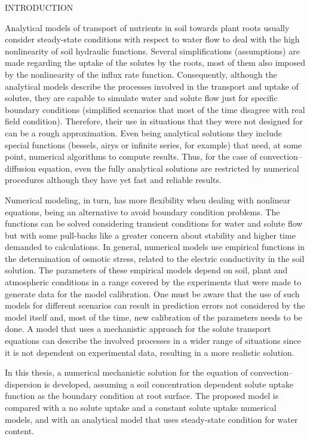 \cleardoublepage
\chap INTRODUCTION

Analytical models of transport of nutrients in soil towards plant roots usually consider steady-state conditions with respect to water flow to deal with the high nonlinearity of soil hydraulic functions. 
Several simplifications (assumptions) are made regarding the uptake of the solutes by the roots, most of them also imposed by the nonlinearity of the influx rate function. 
Consequently, although the analytical models describe the processes involved in the transport and uptake of solutes, they are capable to simulate water and solute flow just for specific boundary conditions (simplified scenarios that most of the time  disagree with real field condition). Therefore, their use in situations that they were not designed for can be a rough approximation.
Even being analytical solutions they include special functions (bessels, airys or infinite series, for example) that need, at some point, numerical algorithms to compute results.
Thus, for the case of convection--diffusion equation, even the fully analytical solutions are restricted by numerical procedures although they have yet fast and reliable results.

Numerical modeling, in turn, has more flexibility when dealing with nonlinear equations, being an alternative to avoid boundary condition problems. 
The functions can be solved considering transient conditions for water and solute flow but with some pull-backs like a greater concern about stability and higher time demanded to calculations.
In general, numerical models use empirical functions in the determination of osmotic stress, related to the electric conductivity in the soil solution. 
The parameters of these empirical models depend on soil, plant and atmospheric conditions in a range covered by the experiments that were made to generate data for the model calibration. 
One must be aware that the use of such models for different scenarios can result in prediction errors 
not considered by the model itself and, most of the time, new calibration of the parameters needs to be done.
A model that uses a mechanistic approach for the solute transport equations can describe the involved processes in a wider range of situations since it is not dependent on experimental data, resulting in a more realistic solution.

In this thesis, a numerical mechanistic solution for the equation of convection--dispersion is developed, assuming a soil concentration dependent solute uptake function as the boundary condition at root surface. The proposed model is compared with a no solute uptake and a constant solute uptake numerical models, and with an analytical model that uses steady-state condition for water content. 

